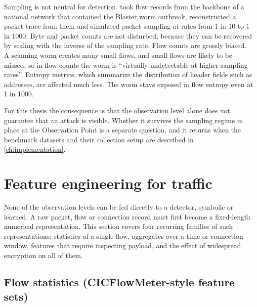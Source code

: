 Sampling is not neutral for detection. \citet{brauckhoff2006samplingimpact}
took flow records from the backbone of a national network that contained
the Blaster worm outbreak, reconstructed a packet trace from them and
simulated packet sampling at rates from 1 in 10 to 1 in 1000. Byte and
packet counts are not disturbed, because they can be recovered by scaling
with the inverse of the sampling rate. Flow counts are grossly biased. A
scanning worm creates many small flows, and small flows are likely to be
missed, so in flow counts the worm is ``virtually undetectable at higher
sampling rates''. Entropy metrics, which summarize the distribution of
header fields such as addresses, are affected much less. The worm stays
exposed in flow entropy even at 1 in 1000.

For this thesis the consequence is that the observation level alone does not
guarantee that an attack is visible. Whether it survives the sampling regime
in place at the Observation Point is a separate question, and it returns
when the benchmark datasets and their collection setup are described in
\cref{ch:implementation}.

\section{Feature engineering for traffic}
\label{sec:feature-engineering-traffic}

None of the observation levels can be fed directly to a detector, symbolic or
learned. A raw packet, flow or connection record must first become a
fixed-length numerical representation. This section covers four recurring
families of such representations: statistics of a single flow, aggregates
over a time or connection window, features that require inspecting payload,
and the effect of widespread encryption on all of them.

\subsection{Flow statistics (CICFlowMeter-style feature sets)}
\label{sec:flow-statistics-cicflowmeter}

